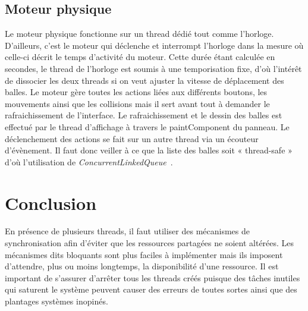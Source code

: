 \documentclass{article}
\begin{document}
\subsection{Moteur physique}

Le moteur physique fonctionne sur un thread dédié tout comme l’horloge. D’ailleurs, c’est le moteur qui déclenche et interrompt l’horloge dans la mesure où celle-ci décrit le temps d’activité du moteur. Cette durée étant calculée en secondes, le thread de l’horloge est soumis à une temporisation fixe, d’où l’intérêt de dissocier les deux threads si on veut ajuster la vitesse de déplacement des balles.
\medbreak
Le moteur gère toutes les actions liées aux différents boutons, les mouvements ainsi que les collisions mais il sert avant tout à demander le rafraichissement de l’interface. Le rafraichissement et le dessin des balles est effectué par le thread d’affichage à travers le paintComponent du panneau.
\medbreak
Le déclenchement des actions se fait sur un autre thread via un écouteur d’évènement. Il faut donc veiller à ce que la liste des balles soit « thread-safe » d’où l’utilisation de \textit{ConcurrentLinkedQueue}~\cite{refJavaQueue}.

\section*{Conclusion}

En présence de plusieurs threads, il faut utiliser des mécanismes de synchronisation afin d’éviter que les ressources partagées ne soient altérées. Les mécanismes dits bloquants sont plus faciles à implémenter mais ils imposent d’attendre, plus ou moins longtemps, la disponibilité d’une ressource.
\medbreak
Il est important de s’assurer d’arrêter tous les threads créés puisque des tâches inutiles qui saturent le système peuvent causer des erreurs de toutes sortes ainsi que des plantages systèmes inopinés.



\end{document}
